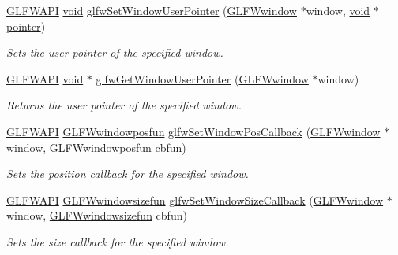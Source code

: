 \begin{DoxyCompactItemize}
\hyperlink{glfw3_8h_a56da5036b2cc259351ae22fd6439bb47}{G\+L\+F\+W\+A\+P\+I} \hyperlink{wglew_8h_aeea6e3dfae3acf232096f57d2d57f084}{void} \hyperlink{group__window_gacc9e68faee3c1763b54cd9bc405cf43e}{glfw\+Set\+Window\+User\+Pointer} (\hyperlink{group__window_ga3c96d80d363e67d13a41b5d1821f3242}{G\+L\+F\+Wwindow} $\ast$window, \hyperlink{wglew_8h_aeea6e3dfae3acf232096f57d2d57f084}{void} $\ast$\hyperlink{glew_8h_ae4ec13b07602b85e317515a2601533da}{pointer})
\begin{DoxyCompactList}\small\item\em Sets the user pointer of the specified window. \end{DoxyCompactList}\item 
\hyperlink{glfw3_8h_a56da5036b2cc259351ae22fd6439bb47}{G\+L\+F\+W\+A\+P\+I} \hyperlink{wglew_8h_aeea6e3dfae3acf232096f57d2d57f084}{void} $\ast$ \hyperlink{group__window_ga0a9ff3b4bf8589e9518e8816d06a8f50}{glfw\+Get\+Window\+User\+Pointer} (\hyperlink{group__window_ga3c96d80d363e67d13a41b5d1821f3242}{G\+L\+F\+Wwindow} $\ast$window)
\begin{DoxyCompactList}\small\item\em Returns the user pointer of the specified window. \end{DoxyCompactList}\item 
\hyperlink{glfw3_8h_a56da5036b2cc259351ae22fd6439bb47}{G\+L\+F\+W\+A\+P\+I} \hyperlink{group__window_gafd8db81fdb0e850549dc6bace5ed697a}{G\+L\+F\+Wwindowposfun} \hyperlink{group__window_gaea610899c4cb070dcd655c6de1fe1d2c}{glfw\+Set\+Window\+Pos\+Callback} (\hyperlink{group__window_ga3c96d80d363e67d13a41b5d1821f3242}{G\+L\+F\+Wwindow} $\ast$window, \hyperlink{group__window_gafd8db81fdb0e850549dc6bace5ed697a}{G\+L\+F\+Wwindowposfun} cbfun)
\begin{DoxyCompactList}\small\item\em Sets the position callback for the specified window. \end{DoxyCompactList}\item 
\hyperlink{glfw3_8h_a56da5036b2cc259351ae22fd6439bb47}{G\+L\+F\+W\+A\+P\+I} \hyperlink{group__window_gae49ee6ebc03fa2da024b89943a331355}{G\+L\+F\+Wwindowsizefun} \hyperlink{group__window_ga150dad5f364425916c5816074cffa5e7}{glfw\+Set\+Window\+Size\+Callback} (\hyperlink{group__window_ga3c96d80d363e67d13a41b5d1821f3242}{G\+L\+F\+Wwindow} $\ast$window, \hyperlink{group__window_gae49ee6ebc03fa2da024b89943a331355}{G\+L\+F\+Wwindowsizefun} cbfun)
\begin{DoxyCompactList}\small\item\em Sets the size callback for the specified window. \end{DoxyCompactList}\item 

\end{DoxyCompactItemize}
